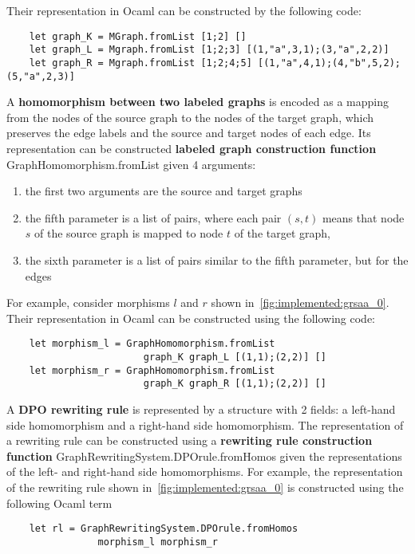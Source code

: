 Their representation in Ocaml can be constructed by the following code:
\begin{verbatim}
    let graph_K = MGraph.fromList [1;2] []
    let graph_L = Mgraph.fromList [1;2;3] [(1,"a",3,1);(3,"a",2,2)]
    let graph_R = Mgraph.fromList [1;2;4;5] [(1,"a",4,1);(4,"b",5,2);(5,"a",2,3)]
\end{verbatim}

A \textbf{homomorphism between two labeled graphs} is encoded as a mapping from the nodes of the source graph to the nodes of the target graph, which preserves the edge labels and the source and target nodes of each edge. Its representation can be constructed \textbf{labeled graph construction function}
\colorbox{Ivory2}{GraphHomomorphism.fromList} given 4 arguments:
    \begin{enumerate}
        \item the first two arguments are the source and target graphs
        \item the fifth parameter is a list of pairs, where each pair $(s,t)$ means that node $s$ of the source graph is mapped to node $t$ of the target graph,
        \item the sixth parameter is a list of pairs similar to the fifth parameter, but for the edges
    \end{enumerate}
For example, consider morphisms $l$ and $r$ shown in~\autoref{fig:implemented:grsaa_0}. Their representation in Ocaml can be constructed using the following code:
\begin{verbatim}
    let morphism_l = GraphHomomorphism.fromList 
                        graph_K graph_L [(1,1);(2,2)] []
    let morphism_r = GraphHomomorphism.fromList
                        graph_K graph_R [(1,1);(2,2)] []
\end{verbatim}

A \textbf{DPO rewriting rule} is represented by a structure with 2 fields: a left-hand side homomorphism and a right-hand side homomorphism. The representation of a rewriting rule can be constructed using a \textbf{rewriting rule construction function} \colorbox{Ivory2}{GraphRewritingSystem.DPOrule.fromHomos} given the representations of the left- and right-hand side homomorphisms. For example, the representation of the rewriting rule shown in~\autoref{fig:implemented:grsaa_0} is constructed using the following Ocaml term 
\begin{verbatim}
    let rl = GraphRewritingSystem.DPOrule.fromHomos 
                morphism_l morphism_r
\end{verbatim}

